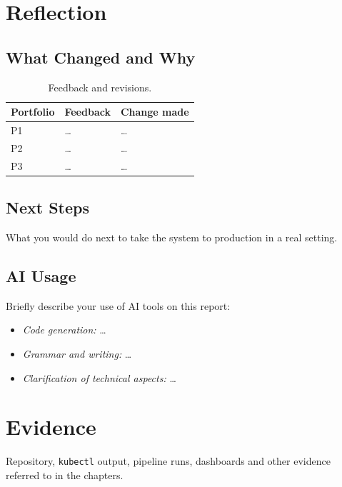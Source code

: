 \documentclass[report]{itvest}
\begin{document}
\chapter{Reflection}

\section{What Changed and Why}

\begin{table}[h]
  \centering
  \begin{tabularx}{\textwidth}{lXX}
    \toprule
    Portfolio & Feedback & Change made \\
    \midrule
    P1 & \ldots & \ldots \\
    P2 & \ldots & \ldots \\
    P3 & \ldots & \ldots \\
    \bottomrule
  \end{tabularx}
  \caption{Feedback and revisions.}
  \label{tab:revisions}
\end{table}

\section{Next Steps}

What you would do next to take the system to production in a real
setting.

\section{AI Usage}

Briefly describe your use of AI tools on this report:

\begin{itemize}
  \item \emph{Code generation:} \ldots
  \item \emph{Grammar and writing:} \ldots
  \item \emph{Clarification of technical aspects:} \ldots
\end{itemize}




\appendix

\chapter{Evidence}

Repository, \texttt{kubectl} output, pipeline runs, dashboards and other
evidence referred to in the chapters.
\end{document}
